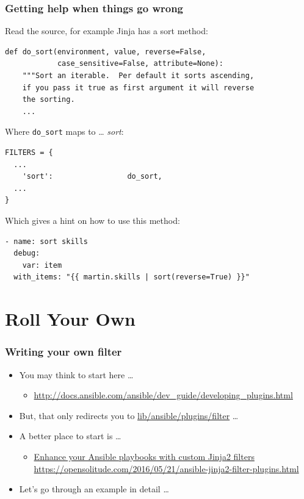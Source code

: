 \documentclass[pdf]{beamer}
\begin{document}
\begin{frame}[t,fragile]
  \frametitle{Getting help when things go wrong}
  Read the source, for example Jinja has a sort method:
  \begin{lstlisting}[title=\tiny\url{https://github.com/pallets/jinja/blob/master/jinja2/filters.py},
  captionpos=b]
def do_sort(environment, value, reverse=False,
            case_sensitive=False, attribute=None):
    """Sort an iterable.  Per default it sorts ascending,
    if you pass it true as first argument it will reverse
    the sorting.
    ...
  \end{lstlisting}
  \pause{}
  Where \texttt{do\_sort} maps to \ldots \pause{} \textit{sort}:
  \begin{lstlisting}
FILTERS = {
  ...
    'sort':                 do_sort,
  ...
}
  \end{lstlisting}
  \pause{}
  Which gives a hint on how to use this method:
  \begin{lstlisting}
- name: sort skills
  debug:
    var: item
  with_items: "{{ martin.skills | sort(reverse=True) }}"
  \end{lstlisting}
\end{frame}

\section{Roll Your Own}

\begin{frame}
  \frametitle{Writing your own filter}
  \begin{itemize}[<+->]
    \item[] You may think to start here \ldots
      \begin{itemize}
        \item<1->
          \small \url{http://docs.ansible.com/ansible/dev_guide/developing_plugins.html}
      \end{itemize}
    \item[]
      But, that only redirects you to
      \href{https://github.com/ansible/ansible/blob/devel/lib/ansible/plugins/filter/core.py}{lib/ansible/plugins/filter} \ldots
    \item[] A better place to start is \ldots
      \begin{itemize}
        \item
          \href{https://opensolitude.com/2016/05/21/ansible-jinja2-filter-plugins.html}{Enhance
          your Ansible playbooks with custom Jinja2 filters} \newline
        \small \url{https://opensolitude.com/2016/05/21/ansible-jinja2-filter-plugins.html}
      \end{itemize}
    \item[] Let's go through an example in detail \ldots
  \end{itemize}
\end{frame}
\end{document}
